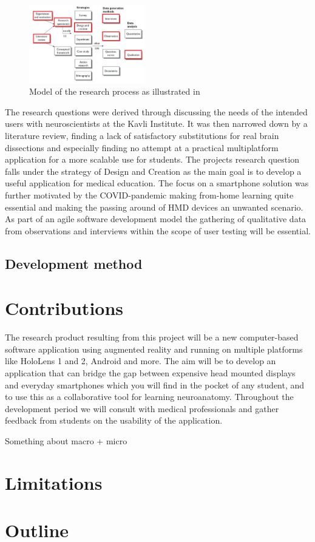 \begin{figure}
    \begin{center}
        \includegraphics[width=0.45\textwidth]{fig/researchplan_image}
    \end{center}
    \caption{Model of the research process as illustrated in \citep{oates2006} }
    \label{researchplan_img}
\end{figure}

The research questions were derived through discussing the needs of the intended users with neuroscientists at the Kavli Institute. It was then narrowed down by a literature review, finding a lack of satisfactory substitutions for real brain dissections and especially finding no attempt at a practical multiplatform application for a more scalable use for students. The projects research question falls under the strategy of Design and Creation as the main goal is to develop a useful application for medical education. The focus on a smartphone solution was further motivated by the COVID-pandemic making from-home learning quite essential and making the passing around of HMD devices an unwanted scenario. As part of an agile software development model the gathering of qualitative data from observations and interviews within the scope of user testing will be essential. 

\subsection*{Development method}

\section{Contributions}

The research product resulting from this project will be a new computer-based software application using augmented reality and running on multiple platforms like HoloLens 1 and 2, Android and more. The aim will be to develop an application that can bridge the gap between expensive head mounted displays and everyday smartphones which you will find in the pocket of any student, and to use this as a collaborative tool for learning neuroanatomy. Throughout the development period we will consult with medical professionals and gather feedback from students on the usability of the application.

{
    \color{BrickRed}
    \noindent
    \newline
    Something about macro + micro
}

\section{Limitations}

\section{Outline}

